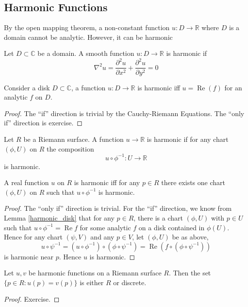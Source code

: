 \subsection{Harmonic Functions}
By the open mapping theorem, a non-constant function $u:D\to\mathbb R$ where $D$ is a domain cannot be analytic.
However, it can be harmonic
\begin{definition}
    Let $D\subset\mathbb C$ be a domain.
    A smooth function $u:D\to\mathbb R$ is harmonic if
    $$\nabla^2 u=\frac{\partial^2u}{\partial x^2}+\frac{\partial^2u}{\partial y^2}=0$$
\end{definition}
\begin{lemma}\label{harmonic_disk}
    Consider a disk $D\subset\mathbb C$, a function $u:D\to\mathbb R$ is harmonic iff $u=\operatorname{Re}(f)$ for an analytic $f$ on $D$.
\end{lemma}
\begin{proof}
    The ``if'' direction is trivial by the Cauchy-Riemann Equations.
    The ``only if'' direction is exercise.
\end{proof}
\begin{definition}
    Let $R$ be a Riemann surface.
    A function $u\to\mathbb R$ is harmonic if for any chart $(\phi,U)$ on $R$ the composition
    $$u\circ\phi^{-1}:U\to\mathbb R$$
    is harmonic.
\end{definition}
\begin{lemma}
    A real function $u$ on $R$ is harmonic iff for any $p\in R$ there exists one chart $(\phi,U)$ on $R$ such that $u\circ\phi^{-1}$ is harmonic.
\end{lemma}
\begin{proof}
    The ``only if'' direction is trivial.
    For the ``if'' direction, we know from Lemma \ref{harmonic_disk} that for any $p\in R$, there is a chart $(\phi,U)$ with $p\in U$ such that $u\circ\phi^{-1}=\operatorname{Re}f$ for some analytic $f$ on a disk contained in $\phi(U)$.
    Hence for any chart $(\psi,V)$ and any $p\in V$, let $(\phi,U)$ be as above,
    $$u\circ\psi^{-1}=(u\circ\phi^{-1})\circ(\phi\circ\psi^{-1})=\operatorname{Re}(f\circ(\phi\circ\psi^{-1}))$$
    is harmonic near $p$.
    Hence $u$ is harmonic.
\end{proof}
\begin{proposition}
    Let $u,v$ be harmonic functions on a Riemann surface $R$.
    Then the set $\{p\in R:u(p)=v(p)\}$ is either $R$ or discrete.
\end{proposition}
\begin{proof}
    Exercise.
\end{proof}
